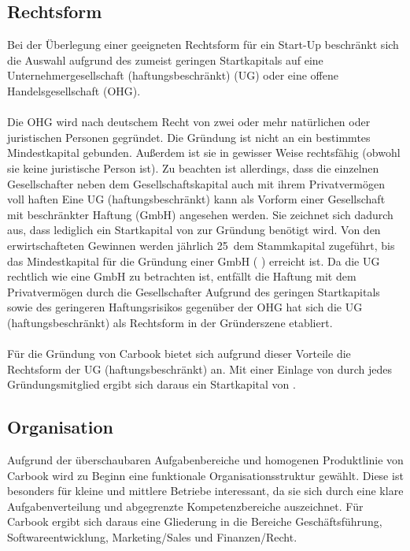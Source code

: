 \documentclass[12pt,ngerman, fleqn]{book} %
\begin{document}
\subsection{Rechtsform}
Bei der Überlegung einer geeigneten Rechtsform für ein Start-Up beschränkt sich die Auswahl aufgrund des zumeist geringen Startkapitals auf eine Unternehmergesellschaft (haftungsbeschränkt) (UG) oder eine offene Handelsgesellschaft (OHG).\\ \\
Die OHG wird nach deutschem Recht von zwei oder mehr natürlichen oder juristischen Personen gegründet. Die Gründung ist nicht an ein bestimmtes Mindestkapital gebunden. Außerdem ist sie in gewisser Weise rechtsfähig (obwohl sie keine juristische Person ist).  Zu beachten ist allerdings, dass die einzelnen Gesellschafter neben dem Gesellschaftskapital auch mit ihrem Privatvermögen voll haften \autocite{handelsgesellschaft} 
Eine UG (haftungsbeschränkt) kann als Vorform einer Gesellschaft mit beschränkter Haftung (GmbH) angesehen werden. Sie zeichnet sich dadurch aus, dass lediglich ein Startkapital von  zur Gründung benötigt wird. Von den erwirtschafteten Gewinnen werden jährlich 25\ dem Stammkapital zugeführt, bis das Mindestkapital für die Gründung einer GmbH ( ) erreicht ist. Da die UG rechtlich wie eine GmbH zu betrachten ist, entfällt die Haftung mit dem Privatvermögen durch die Gesellschafter %
Aufgrund des geringen Startkapitals sowie des geringeren Haftungsrisikos gegenüber der OHG hat sich die UG (haftungsbeschränkt) als Rechtsform in der Gründerszene etabliert.\\ \\
Für die Gründung von Carbook bietet sich aufgrund dieser Vorteile die Rechtsform der UG (haftungsbeschränkt) an. Mit einer Einlage von  durch jedes Gründungsmitglied ergibt sich daraus ein Startkapital von .

\subsection{Organisation}
Aufgrund der überschaubaren Aufgabenbereiche und homogenen Produktlinie von Carbook wird zu Beginn eine funktionale Organisationsstruktur gewählt. Diese ist besonders für kleine und mittlere Betriebe interessant, da sie sich durch eine klare Aufgabenverteilung und abgegrenzte Kompetenzbereiche auszeichnet. Für Carbook ergibt sich daraus eine Gliederung in die Bereiche Geschäftsführung, Softwareentwicklung, Marketing/Sales und Finanzen/Recht. \\ \\
\end{document}
